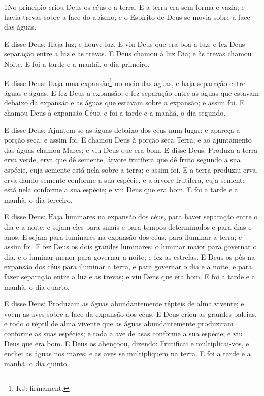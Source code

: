 
\lettrine{1} No princípio criou Deus os céus e a terra. E
a terra era sem forma e vazia; e havia trevas sobre a face do
abismo; e o Espírito de Deus se movia sobre a face das águas.

E disse Deus: Haja luz; e houve luz. E viu Deus que era boa a
luz; e fez Deus separação entre a luz e as trevas. E Deus chamou
à luz Dia; e às trevas chamou Noite. E foi a tarde e a manhã, o dia
primeiro.

E disse Deus: Haja uma expansão\footnote{KJ: firmament.} no meio
das águas, e haja separação entre águas e águas. E fez Deus a
expansão, e fez separação entre as águas que estavam debaixo da
expansão e as águas que estavam sobre a expansão; e assim foi. E
chamou Deus à expansão Céus, e foi a tarde e a manhã, o dia segundo.

E disse Deus: Ajuntem-se as águas debaixo dos céus num lugar; e
apareça a porção seca; e assim foi. E chamou Deus à porção
seca Terra; e ao ajuntamento das águas chamou Mares; e viu Deus que
era bom. E disse Deus: Produza a terra erva verde, erva que
dê semente, árvore frutífera que dê fruto segundo a sua espécie,
cuja semente está nela sobre a terra; e assim foi. E a terra
produziu erva, erva dando semente conforme a sua espécie, e a árvore
frutífera, cuja semente está nela conforme a sua espécie; e viu Deus
que era bom. E foi a tarde e a manhã, o dia terceiro.

E disse Deus: Haja luminares na expansão dos céus, para haver
separação entre o dia e a noite; e sejam eles para sinais e para
tempos determinados e para dias e anos. E sejam para
luminares na expansão dos céus, para iluminar a terra; e assim foi.
E fez Deus os dois grandes luminares: o luminar maior para
governar o dia, e o luminar menor para governar a noite; e fez as
estrelas. E Deus os pôs na expansão dos céus para iluminar a
terra, e para governar o dia e a noite, e para fazer
separação entre a luz e as trevas; e viu Deus que era bom. E
foi a tarde e a manhã, o dia quarto.

E disse Deus: Produzam as águas abundantemente répteis de alma
vivente; e voem as aves sobre a face da expansão dos céus. E
Deus criou as grandes baleias, e todo o réptil de alma vivente que
as águas abundantemente produziram conforme as suas espécies; e toda
a ave de asas conforme a sua espécie; e viu Deus que era bom.
E Deus os abençoou, dizendo: Frutificai e multiplicai-vos, e
enchei as águas nos mares; e as aves se multipliquem na terra.
E foi a tarde e a manhã, o dia quinto.

